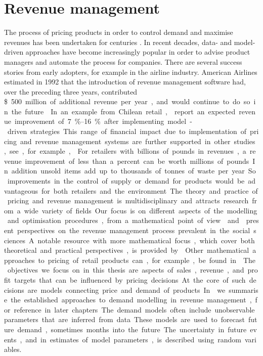 \documentclass[main.tex]{subfiles}
\begin{document}
\section{Revenue management}

The process of pricing products in order to control demand and
maximise revenues has been undertaken for centuries
\citep[Book~1]{smith1776inquiry}. In recent
decades, data- and model-driven approaches have become increasingly
popular in order to advise product managers and automate the process for companies.
There are several success stories from early adopters, for example in
the airline industry.
American Airlines estimated in 1992 that the introduction of revenue
management software had, over the preceding three
years, contributed \SI{500}[\$] million of additional revenue per year,
and would continue to do so in the future \citep{smith1992yield}.
In an example from Chilean retail, \citet{bitran1998coordinating}
report an expected revenue improvement of \SIrange{7}{16}{\percent} after implementing
model-driven strategies.
This range of financial impact due to implementation of pricing and revenue
management systems are further supported in other studies, see, for example, \citet[Ch.~1.2]{phillips2005pricing}.
For retailers with billions of pounds in revenues, a revenue improvement of
less than a percent can be worth millions of pounds.
In addition unsold items add up to thousands of tonnes of waste per year. So
improvements in the control of supply or demand for products would be advantageous
for both retailers and the environment.

The theory and practice of pricing and revenue management is
multidisciplinary and attracts research from a wide variety of
fields. Our focus is on different aspects of the modelling and
optimisation procedures, from a mathematical point of view.
\citet{phillips2005pricing} and \citet{ozer2012oxford} present perspectives on the
revenue management process prevalent in the social sciences.
A notable resource with more mathematical focus, which
cover both theoretical and practical
perspectives, is provided by \citet{talluri2006theory}.
Other mathematical approaches to pricing of retail products
can, for example, be found in \citet{butler2014customer}.

The objectives we focus on in this thesis are aspects of sales,
revenue, and profit targets that can be influenced by pricing
decisions.  At the core of such decisions are models connecting price
and demand of products.  In  we summarise
the established approaches to demand modelling in revenue management, for
reference in later chapters.  The demand models often include
unobservable parameters that are inferred from data.  These models are
used to forecast future demand, sometimes months into the future.  The
uncertainty in future events, and in estimates of model parameters, is
described using random variables.
\end{document}
